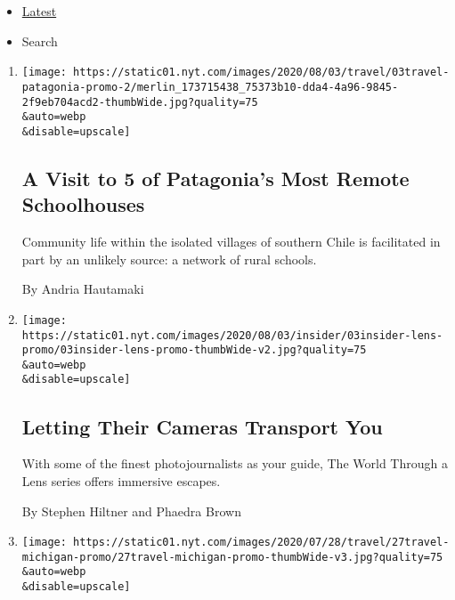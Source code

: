 \begin{itemize}
\tightlist
\item
  \protect\hyperlink{stream-panel}{Latest}
\item
  Search
\end{itemize}

\begin{enumerate}
\def\labelenumi{\arabic{enumi}.}
\item
  \href{/2020/08/03/travel/remote-schools-patagonia.html}{}

  \texttt{[image: https://static01.nyt.com/images/2020/08/03/travel/03travel-patagonia-promo-2/merlin\_173715438\_75373b10-dda4-4a96-9845-2f9eb704acd2-thumbWide.jpg?quality=75\\\&auto=webp\\\&disable=upscale]}

  \hypertarget{a-visit-to-5-of-patagonias-most-remote-schoolhouses}{%
  \subsection{A Visit to 5 of Patagonia's Most Remote
  Schoolhouses}\label{a-visit-to-5-of-patagonias-most-remote-schoolhouses}}

  Community life within the isolated villages of southern Chile is
  facilitated in part by an unlikely source: a network of rural schools.

  By Andria Hautamaki
\item
  \href{/2020/08/03/insider/letting-their-cameras-transport-you.html}{}

  \texttt{[image: https://static01.nyt.com/images/2020/08/03/insider/03insider-lens-promo/03insider-lens-promo-thumbWide-v2.jpg?quality=75\\\&auto=webp\\\&disable=upscale]}

  \hypertarget{letting-their-cameras-transport-you}{%
  \subsection{Letting Their Cameras Transport
  You}\label{letting-their-cameras-transport-you}}

  With some of the finest photojournalists as your guide, The World
  Through a Lens series offers immersive escapes.

  By Stephen Hiltner and Phaedra Brown
\item
  \href{/2020/07/27/travel/moose-michigan-isle-royale.html}{}

  \texttt{[image: https://static01.nyt.com/images/2020/07/28/travel/27travel-michigan-promo/27travel-michigan-promo-thumbWide-v3.jpg?quality=75\\\&auto=webp\\\&disable=upscale]}


\end{enumerate}
